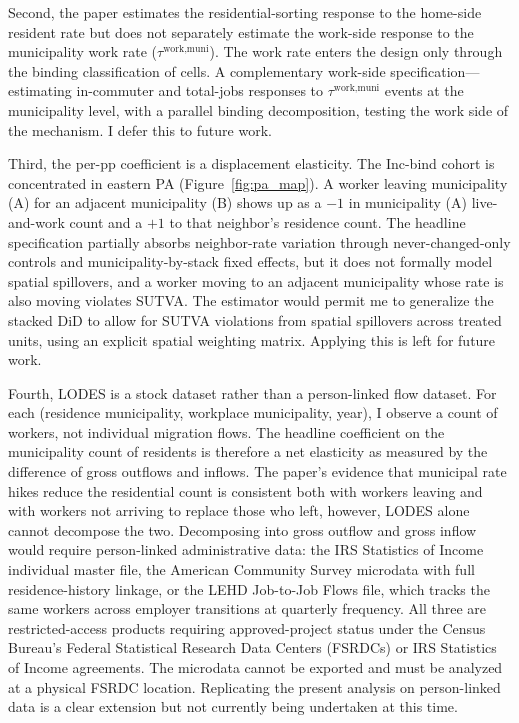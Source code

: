\documentclass[12pt]{article}
\begin{document}
Second, the paper estimates the residential-sorting response to the
home-side resident rate but does not separately estimate the
work-side response to the municipality work rate ($\tau^{\text{work,muni}}$).
The work rate enters the design only through the
binding classification of cells. A complementary work-side
specification---estimating in-commuter and total-jobs responses to
$\tau^{\text{work,muni}}$ events at the municipality level, with a parallel
binding decomposition, testing the work side of the mechanism. I defer this to future work.

Third, the per-pp coefficient is a displacement elasticity. The Inc-bind cohort is concentrated in eastern PA
(Figure~\ref{fig:pa_map}). A worker leaving municipality (A) for an
adjacent municipality (B) shows up as a $-1$ in municipality (A) live-and-work
count and a $+1$ to that neighbor's residence count. The
headline specification partially absorbs neighbor-rate variation
through never-changed-only controls and municipality-by-stack
fixed effects, but it does not formally model spatial spillovers,
and a worker moving to an adjacent municipality whose rate is also moving
violates SUTVA. The
\citet{buttsDifferenceinDifferencesEstimationSpatial2023}
estimator would permit me to generalize the stacked DiD to allow for SUTVA violations
from spatial spillovers across treated units, using an explicit
spatial weighting matrix. Applying this is left for future work.

Fourth, LODES is a stock dataset rather than a person-linked
flow dataset. For each (residence municipality, workplace municipality, year), I
observe a count of workers, not individual migration flows. The headline coefficient on the municipality count of residents
is therefore a net elasticity as measured by the difference of gross outflows and inflows. The paper's evidence that municipal rate
hikes reduce the residential count is consistent both with workers
leaving and with workers not arriving to replace those who left, however,
LODES alone cannot decompose the two. Decomposing into gross
outflow and gross inflow would require person-linked
administrative data: the IRS Statistics of Income individual master
file, the American Community Survey microdata with full
residence-history linkage, or the LEHD
Job-to-Job Flows file, which tracks the same workers across
employer transitions at quarterly frequency. All three are
restricted-access products requiring approved-project status under
the Census Bureau's Federal Statistical Research Data Centers
(FSRDCs) or IRS Statistics of Income agreements. The microdata
cannot be exported and must be analyzed at a physical FSRDC
location. Replicating the present analysis on person-linked data
is a clear extension but not currently being undertaken at this time.
\end{document}
